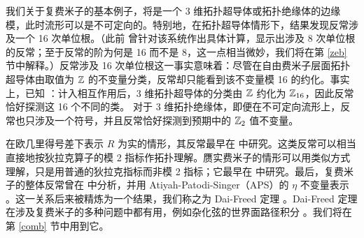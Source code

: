 我们关于复费米子的基本例子，将是一个 3 维拓扑超导体或拓扑绝缘体的边缘模，此时流形可以是不可定向的。特别地，在拓扑超导体情形下，结果发现反常涉及一个 16 次单位根。（此前 \cite{HCR} 曾针对该系统作出具体计算，显示出涉及 8 次单位根的反常；至于反常的阶为何是 16 而不是 8，这一点相当微妙，我们将在第 \ref{zeb} 节中解释。）反常涉及 16 次单位根这一事实意味着：尽管在自由费米子层面拓扑超导体由取值为 ${\mathbb{Z}}$ 的不变量分类，反常却只能看到该不变量模 16 的约化。事实上，已知 \cite{FCV,WS,MFCV,KitTwo}：计入相互作用后，3 维拓扑超导体的分类由 ${\mathbb{Z}}$ 约化为 ${\mathbb{Z}}_{16}$，因此反常恰好探测这 16 个不同的类。
对于 3 维拓扑绝缘体，即便在不可定向流形上，反常也只涉及一个符号，并且反常恰好探测到预期中的 ${\mathbb{Z}}_2$ 值不变量。

在欧几里得号差下表示 $R$ 为实的情形，其反常最早在 \cite{Witold,Witoldtwo} 中研究。这类反常可以相当直接地按狄拉克算子的模 2 指标作拓扑理解。赝实费米子的情形可以用类似方式理解，只是用普通的狄拉克指标而非模 2 指标；它最早在 \cite{R,Semenoff,ADM} 中研究。最后，复费米子的整体反常曾在 \cite{Global} 中分析，并用 Atiyah-Patodi-Singer（APS）的 $\eta$ 不变量表示 \cite{APS}。这一关系后来被精炼为一个结果，我们称之为 Dai-Freed 定理 \cite{DF}。Dai-Freed 定理在涉及复费米子的多种问题中都有用，例如杂化弦的世界面路径积分 \cite{Dinstanton}。我们将在第 \ref{comb} 节中用到它。

